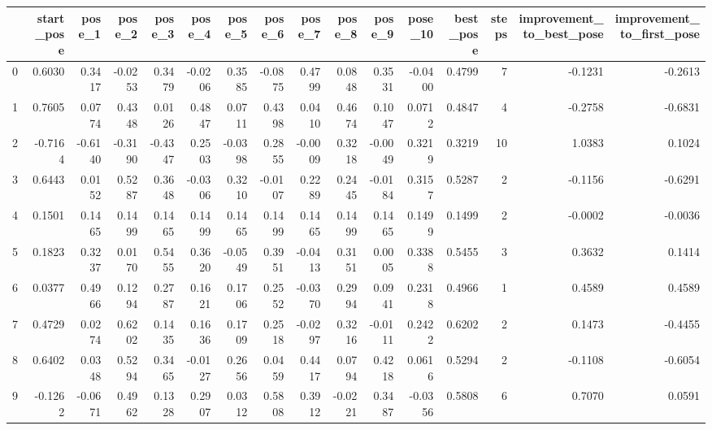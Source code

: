 \begin{tabular}{lrrrrrrrrrrrrrrr}
\toprule
{} &  start\_pose &  pose\_1 &  pose\_2 &  pose\_3 &  pose\_4 &  pose\_5 &  pose\_6 &  pose\_7 &  pose\_8 &  pose\_9 &  pose\_10 &  best\_pose &  steps &  improvement\_to\_best\_pose &  improvement\_to\_first\_pose \\
\midrule
0 &      0.6030 &  0.3417 & -0.0253 &  0.3479 & -0.0206 &  0.3585 & -0.0875 &  0.4799 &  0.0848 &  0.3531 &  -0.0400 &     0.4799 &      7 &                   -0.1231 &                    -0.2613 \\
1 &      0.7605 &  0.0774 &  0.4348 &  0.0126 &  0.4847 &  0.0711 &  0.4398 &  0.0410 &  0.4674 &  0.1047 &   0.0712 &     0.4847 &      4 &                   -0.2758 &                    -0.6831 \\
2 &     -0.7164 & -0.6140 & -0.3190 & -0.4347 &  0.2503 & -0.0398 &  0.2855 & -0.0009 &  0.3218 & -0.0049 &   0.3219 &     0.3219 &     10 &                    1.0383 &                     0.1024 \\
3 &      0.6443 &  0.0152 &  0.5287 &  0.3648 & -0.0306 &  0.3210 & -0.0107 &  0.2289 &  0.2445 & -0.0184 &   0.3157 &     0.5287 &      2 &                   -0.1156 &                    -0.6291 \\
4 &      0.1501 &  0.1465 &  0.1499 &  0.1465 &  0.1499 &  0.1465 &  0.1499 &  0.1465 &  0.1499 &  0.1465 &   0.1499 &     0.1499 &      2 &                   -0.0002 &                    -0.0036 \\
5 &      0.1823 &  0.3237 &  0.0170 &  0.5455 &  0.3620 & -0.0549 &  0.3951 & -0.0413 &  0.3151 &  0.0005 &   0.3388 &     0.5455 &      3 &                    0.3632 &                     0.1414 \\
6 &      0.0377 &  0.4966 &  0.1294 &  0.2787 &  0.1621 &  0.1706 &  0.2552 & -0.0370 &  0.2994 &  0.0941 &   0.2318 &     0.4966 &      1 &                    0.4589 &                     0.4589 \\
7 &      0.4729 &  0.0274 &  0.6202 &  0.1435 &  0.1636 &  0.1709 &  0.2518 & -0.0297 &  0.3216 & -0.0111 &   0.2422 &     0.6202 &      2 &                    0.1473 &                    -0.4455 \\
8 &      0.6402 &  0.0348 &  0.5294 &  0.3465 & -0.0127 &  0.2656 &  0.0459 &  0.4417 &  0.0794 &  0.4218 &   0.0616 &     0.5294 &      2 &                   -0.1108 &                    -0.6054 \\
9 &     -0.1262 & -0.0671 &  0.4962 &  0.1328 &  0.2907 &  0.0312 &  0.5808 &  0.3912 & -0.0221 &  0.3487 &  -0.0356 &     0.5808 &      6 &                    0.7070 &                     0.0591 \\
\bottomrule
\end{tabular}
